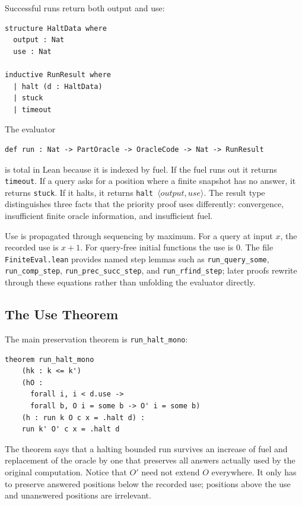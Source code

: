 Successful runs return both output and use:

\begin{lstlisting}
structure HaltData where
  output : Nat
  use : Nat

inductive RunResult where
  | halt (d : HaltData)
  | stuck
  | timeout
\end{lstlisting}

The evaluator

\begin{lstlisting}
def run : Nat -> PartOracle -> OracleCode -> Nat -> RunResult
\end{lstlisting}

is total in Lean because it is indexed by fuel.  If the fuel runs out it
returns \texttt{timeout}.  If a query asks for a position where a finite
snapshot has no answer, it returns \texttt{stuck}.  If it halts, it returns
\texttt{halt \(\langle output,use\rangle\)}.  The result type distinguishes
three facts that the priority proof uses differently: convergence,
insufficient finite oracle information, and insufficient fuel.

Use is propagated through sequencing by maximum.  For a query at input
\(x\), the recorded use is \(x+1\).  For query-free initial functions the
use is \(0\).  The file \texttt{FiniteEval.lean} provides named step
lemmas such as \texttt{run_query_some}, \texttt{run_comp_step},
\texttt{run_prec_succ_step}, and \texttt{run_rfind_step}; later proofs
rewrite through these equations rather than unfolding the evaluator
directly.

\subsection{The Use Theorem}

The main preservation theorem is \texttt{run_halt_mono}:

\begin{lstlisting}
theorem run_halt_mono
    (hk : k <= k')
    (hO :
      forall i, i < d.use ->
      forall b, O i = some b -> O' i = some b)
    (h : run k O c x = .halt d) :
    run k' O' c x = .halt d
\end{lstlisting}

The theorem says that a halting bounded run survives an increase of fuel
and replacement of the oracle by one that preserves all answers actually
used by the original computation.  Notice that \(O'\) need not extend \(O\)
everywhere.  It only has to preserve answered positions below the recorded
use; positions above the use and unanswered positions are irrelevant.

